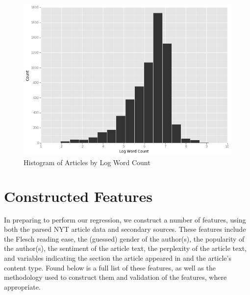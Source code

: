 \documentclass[fleqn,12pt]{SelfArx} %
\begin{document}
\begin{figure}[ht]\centering
\includegraphics[width=\linewidth]{log_wordcount_hist}
\caption{Histogram of Articles by Log Word Count}
\label{fig:lpv_hist}
\end{figure}



\section{Constructed Features}

In preparing to perform our regression, we construct a number of features, using both the parsed NYT article data and secondary sources. These features include the Flesch reading ease, the (guessed) gender of the author(s), the popularity of the author(s), the sentiment of the article text, the perplexity of the article text, and variables indicating the section the article appeared in and the article's content type. Found below is a full list of these features, as well as the methodology used to construct them and validation of the features, where appropriate.
\end{document}
